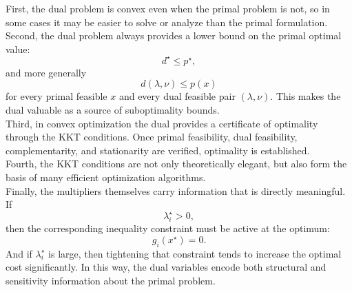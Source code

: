 First, the dual problem is convex even when the primal problem is not, so in some cases it may
be easier to solve or analyze than the primal formulation.\\
Second, the dual problem always provides a lower bound on the primal optimal value:
\[
d^\star \le p^\star,
\]
and more generally
\[
d(\lambda,\nu)\le p(x)
\]
for every primal feasible \(x\) and every dual feasible pair \((\lambda,\nu)\). This makes the dual
valuable as a source of suboptimality bounds.\\
Third, in convex optimization the dual provides a certificate of optimality through the KKT
conditions. Once primal feasibility, dual feasibility, complementarity, and stationarity are
verified, optimality is established.\\
Fourth, the KKT conditions are not only theoretically elegant, but also form the basis of many
efficient optimization algorithms.\\
Finally, the multipliers themselves carry information that is directly meaningful. If
\[
\lambda_i^\star > 0,
\]
then the corresponding inequality constraint must be active at the optimum:
\[
g_i(x^\star)=0.
\]
And if \(\lambda_i^\star\) is large, then tightening that constraint tends to increase the optimal cost
significantly. In this way, the dual variables encode both structural and sensitivity information
about the primal problem.
